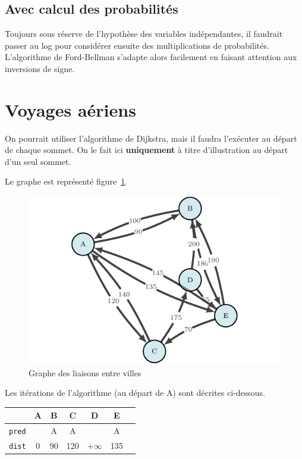 \documentclass[paper=a4, fontsize=11pt]{scrartcl} %
\numberwithin{equation}{section} %
\numberwithin{figure}{section} %
\numberwithin{table}{section} %
\begin{document}
\subsection{Avec calcul des probabilités}

Toujours sous réserve de l'hypothèse des variables indépendantes, il faudrait passer au log pour considérer ensuite des multiplications de probabilités. L'algorithme de Ford-Bellman s'adapte alors facilement en faisant attention aux inversions de signe.


\section{Voyages aériens}

On pourrait utiliser l'algorithme de Dijkstra, mais il faudra l'exécuter au départ de chaque sommet. On le fait ici \textbf{uniquement} à titre d'illustration au départ d'un seul sommet.

Le graphe est représenté figure~\ref{fig:airline}.

\begin{figure}
  \begin{center}
    \includegraphics[width=12cm]{airline.pdf}
    \caption{Graphe des liaisons entre villes}
    \label{fig:airline}
  \end{center}
\end{figure}

Les itérations de l'algorithme (au départ de A) sont décrites ci-dessous. 

  
\begin{tabular}{c|cccccc}
  & \textbf{A}	&B	&C	&D	&E	& \\
  \hline
  \texttt{pred} &	&A	&A	&	&A	&\\
  \texttt{dist} & 0	&90	&120	&$+\infty$	&135	&\\
\end{tabular}
\end{document}
